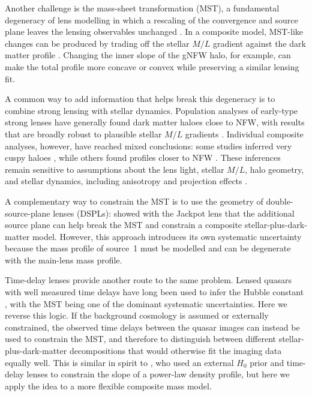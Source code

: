 \documentclass[fleqn,usenatbib]{mnras}
\begin{document}
Another challenge is the mass-sheet transformation (MST), a fundamental degeneracy of lens modelling in which a rescaling of the convergence and source plane leaves the lensing observables unchanged \citep{Falco1985,Schneider2013}. In a composite model, MST-like changes can be produced by trading off the stellar $M/L$ gradient against the dark matter profile \citep{Li2025a}. Changing the inner slope of the gNFW halo, for example, can make the total profile more concave or convex while preserving a similar lensing fit.

A common way to add information that helps break this degeneracy is to combine strong lensing with stellar dynamics. Population analyses of early-type strong lenses have generally found dark matter haloes close to NFW, with results that are broadly robust to plausible stellar $M/L$ gradients \citep{Shajib2021,Sheu2025}. Individual composite analyses, however, have reached mixed conclusions: some studies inferred very cuspy haloes \citep{Sonnenfeld2012,Oldham2018}, while others found profiles closer to NFW \citep{Collett2018,Melo2025}. These inferences remain sensitive to assumptions about the lens light, stellar $M/L$, halo geometry, and stellar dynamics, including anisotropy and projection effects \citep{Huang2025}.

A complementary way to constrain the MST is to use the geometry of double-source-plane lenses (DSPLs): \citet{Tian2026} showed with the Jackpot lens that the additional source plane can help break the MST and constrain a composite stellar-plus-dark-matter model. However, this approach introduces its own systematic uncertainty because the mass profile of source~1 must be modelled and can be degenerate with the main-lens mass profile.

Time-delay lenses provide another route to the same problem. Lensed quasars with well measured time delays have long been used to infer the Hubble constant \citep[see][and references therein]{Tdcosmo2025}, with the MST being one of the dominant systematic uncertainties. Here we reverse this logic. If the background cosmology is assumed or externally constrained, the observed time delays between the quasar images can instead be used to constrain the MST, and therefore to distinguish between different stellar-plus-dark-matter decompositions that would otherwise fit the imaging data equally well. This is similar in spirit to \citet{DobkeKing2006}, who used an external \(H_0\) prior and time-delay lenses to constrain the slope of a power-law density profile, but here we apply the idea to a more flexible composite mass model.
\end{document}
